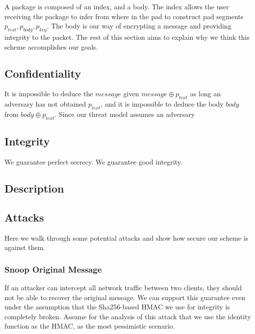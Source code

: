 \documentclass[twocolumn]{article}
\begin{document}
A package is composed of an index, and a body. The index allows the user receiving the package to infer from where in the pad to construct pad segments $p_{text}, p_{body}, p_{key}$. The body is our way of encrypting a message and providing integrity to the packet. The rest of this section aims to explain why we think this scheme accomplishes our goals.  

\subsection{Confidentiality}
It is impossible to deduce the $message$ given $message \oplus p_{text}$
as long an adversary has not obtained $p_{text}$, and it is impossible to deduce the body $body$ from $body \oplus p_{text}$. Since our threat model assumes an adversary 

\subsection{Integrity}

We guarantee perfect secrecy.
We guarantee good integrity.

\subsection{Description}

\subsection{Attacks}
Here we walk through some potential attacks and show how secure our scheme is against them.

\subsubsection{Snoop Original Message}
If an attacker can intercept all network traffic between two clients, they should not be able to recover the original message.
We can support this guarantee even under the assumption that the Sha256-based HMAC we use for integrity is completely broken.
Assume for the analysis of this attack that we use the identity function as the HMAC, as the most pessimistic scenario.
\end{document}
